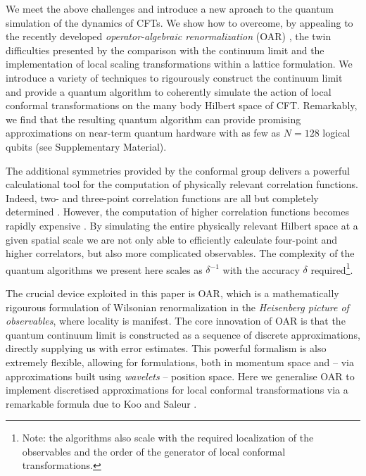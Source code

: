 \documentclass[12pt]{article}
\newcommand{\1}{\mathds{1}}
\begin{document}
We meet the above challenges \cite{preskillSimulatingQuantumField2018,ziniConformalFieldTheories2018} and introduce a new aproach to the quantum simulation of the dynamics of CFTs. We show how to overcome, by appealing to the recently developed \emph{operator-algebraic renormalization} (OAR) \cite{osborneContinuumLimitsQuantum2019,stottmeisterOperatoralgebraicRenormalizationWavelets2020,morinelliScalingLimitsLattice2020}, the twin difficulties presented by the comparison with the continuum limit and the implementation of local scaling transformations within a lattice formulation. We introduce a variety of techniques to rigourously construct the continuum limit and provide a quantum algorithm to coherently simulate the action of local conformal transformations on the many body Hilbert space of CFT. Remarkably, we find that the resulting quantum algorithm can provide promising approximations on near-term quantum hardware with as few as $N=128$ logical qubits (see Supplementary Material). 

The additional symmetries provided by the conformal group delivers a powerful calculational tool for the computation of physically relevant correlation functions. Indeed, two- and three-point correlation functions are all but completely determined \cite{belavinInfiniteConformalSymmetry1984,francescoConformalFieldTheory1997}. However, the computation of higher correlation functions becomes rapidly expensive \cite{baoQuantumAlgorithmsConformal2019}. By simulating the entire physically relevant Hilbert space at a given spatial scale we are not only able to efficiently calculate four-point and higher correlators, but also more complicated observables. The complexity of the quantum algorithms we present here scales as $\delta^{-1}$ with the accuracy $\delta$ required\footnote{Note: the algorithms also scale with the required localization of the observables and the order of the generator of local conformal transformations.}.

The crucial device exploited in this paper is OAR, which is a mathematically rigourous formulation of Wilsonian renormalization in the \emph{Heisenberg picture of observables}, where locality is manifest. The core innovation of OAR is that the quantum continuum limit is constructed as a sequence of discrete approximations, directly supplying us with error estimates. This powerful formalism is also extremely flexible, allowing for formulations, both in momentum space and -- via approximations built using \emph{wavelets} \cite{daubechiesTenLecturesWavelets1992} -- position space. Here we generalise OAR to implement discretised approximations for local conformal transformations via a remarkable formula due to Koo and Saleur \cite{kooRepresentationsVirasoroAlgebra1994b}. 
\end{document}
